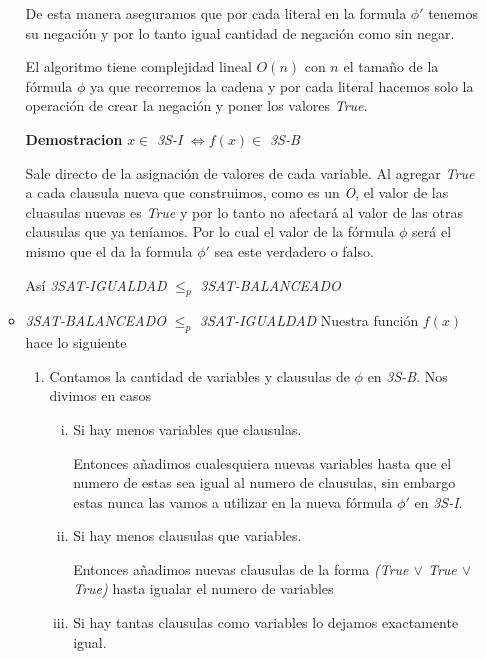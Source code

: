 \documentclass[12pt,letterpaper]{article}
\begin{document}
\begin{itemize}
\begin{itemize}[$\heartsuit$]
        De esta manera aseguramos que por cada literal en la formula $\phi'$ tenemos su negación y por lo tanto igual cantidad de negación como sin negar.
        
        El algoritmo tiene complejidad lineal $O(n)$ con $n$ el tamaño de la fórmula $\phi$ ya que recorremos la cadena y por cada literal hacemos solo la operación de crear la negación y poner los valores \textit{True}.
        
        \textbf{Demostracion} $x \in$ \textit{3S-I} $\Leftrightarrow f(x) \in$ \textit{3S-B}
        
        Sale directo de la asignación de valores de cada variable. Al agregar \textit{True} a cada clausula nueva que construimos, como es un \textit{O}, el valor de las cluasulas nuevas es \textit{True} y por lo tanto no afectará al valor de las otras clausulas que ya teníamos. Por lo cual el valor de la fórmula $\phi$ será el mismo que el da la formula $\phi'$ sea este verdadero o falso.
        
        Así \textit{3SAT-IGUALDAD} $\leq_p$ \textit{3SAT-BALANCEADO}
        
        \item \textit{3SAT-BALANCEADO} $\leq_p$ \textit{3SAT-IGUALDAD}  
        Nuestra función $f(x)$ hace lo siguiente
        \begin{enumerate}
            \item Contamos la cantidad de variables y clausulas de $\phi$ en \textit{3S-B}. Nos divimos en casos
            \begin{enumerate}[i.]
                \item Si hay menos variables que clausulas.
                
                Entonces añadimos cualesquiera nuevas variables hasta que el numero de estas sea igual al numero de clausulas, sin embargo estas nunca las vamos a utilizar en la nueva fórmula $\phi'$ en \textit{3S-I}.
                
                \item Si hay menos clausulas que variables.
                
                Entonces añadimos nuevas clausulas de la forma \textit{(True $\vee$ True $\vee$  True)} hasta igualar el numero de variables
                
                \item Si hay tantas clausulas como variables lo dejamos exactamente igual.
            \end{enumerate}
        \end{enumerate}
    

\end{itemize}
\end{itemize}
\end{document}
